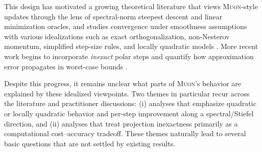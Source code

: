 \documentclass{article}
\theoremstyle{plain}
\theoremstyle{definition}
\theoremstyle{remark}
\newcommand{\Muon}{\textsc{Muon}}
\begin{document}
This design has motivated a growing theoretical literature 
that views \Muon{}-style updates through the lens of 
spectral-norm steepest descent and linear minimization oracles, 
and studies convergence under smoothness assumptions 
with various idealizations such as exact orthogonalization, 
non-Nesterov momentum,
simplified step-size rules, and locally quadratic models
\cite{pethick2025normconstrainedlmo,
li2025noteconvergencemuon,shen2025convergencemuon,
chen2025muonspectralnorm,kovalev2025understandinggo,
riabinin2025gluon,gruntkowska2025ef21muon,sato2025muonconvergence,nagashima2026improvedconvergenceratesmuon}.
More recent work begins to incorporate \emph{inexact} 
polar steps and quantify how approximation error propagates 
in worst-case bounds
\cite{shulgin2025beyondideal,anon2025newtonschulz,lau2025polargrad}.

Despite this progress, it remains unclear 
what parts of \Muon{}'s behavior are explained by these idealized viewpoints. 
Two themes in particular recur across the literature and practitioner discussions:
(i) analyses that emphasize quadratic or locally quadratic 
behavior and per-step improvement along a spectral/Stiefel direction,
and (ii) analyses that treat projection inexactness 
primarily as a computational cost--accuracy tradeoff.
These themes naturally 
lead to several basic questions that 
are not settled by existing results.
\end{document}
